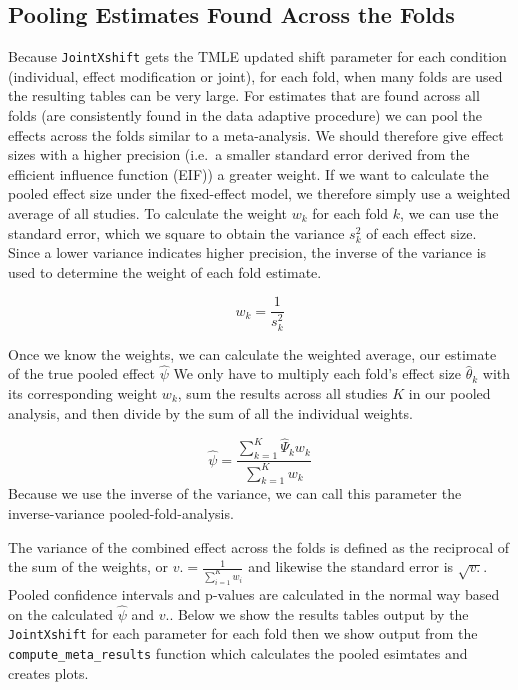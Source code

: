 \documentclass[
]{article}
\begin{document}
\hypertarget{pooling-estimates-found-across-the-folds}{%
\subsection{Pooling Estimates Found Across the
Folds}\label{pooling-estimates-found-across-the-folds}}

Because \texttt{JointXshift} gets the TMLE updated shift parameter for
each condition (individual, effect modification or joint), for each
fold, when many folds are used the resulting tables can be very large.
For estimates that are found across all folds (are consistently found in
the data adaptive procedure) we can pool the effects across the folds
similar to a meta-analysis. We should therefore give effect sizes with a
higher precision (i.e.~a smaller standard error derived from the
efficient influence function (EIF)) a greater weight. If we want to
calculate the pooled effect size under the fixed-effect model, we
therefore simply use a weighted average of all studies. To calculate the
weight \(w_k\) for each fold \(k\), we can use the standard error, which
we square to obtain the variance \(s^2_k\) of each effect size. Since a
lower variance indicates higher precision, the inverse of the variance
is used to determine the weight of each fold estimate.

\[w_k = \frac{1}{s^2_k}\]

Once we know the weights, we can calculate the weighted average, our
estimate of the true pooled effect \(\hat{\psi}\) We only have to
multiply each fold's effect size \(\hat{\theta}_k\) with its
corresponding weight \(w_k\), sum the results across all studies \(K\)
in our pooled analysis, and then divide by the sum of all the individual
weights.

\[\hat{\psi} = \frac{\sum_{k = 1}^K \hat{\Psi}_k w_k}{\sum_{k = 1}^K w_k}\]
Because we use the inverse of the variance, we can call this parameter
the inverse-variance pooled-fold-analysis.

The variance of the combined effect across the folds is defined as the
reciprocal of the sum of the weights, or
\(v. = \frac{1}{\sum_{i=1}^K w_i}\) and likewise the standard error is
\(\sqrt{v.}\). Pooled confidence intervals and p-values are calculated
in the normal way based on the calculated \(\hat{\psi}\) and \(v.\).
Below we show the results tables output by the \texttt{JointXshift} for
each parameter for each fold then we show output from the
\texttt{compute\_meta\_results} function which calculates the pooled
esimtates and creates plots.
\end{document}
